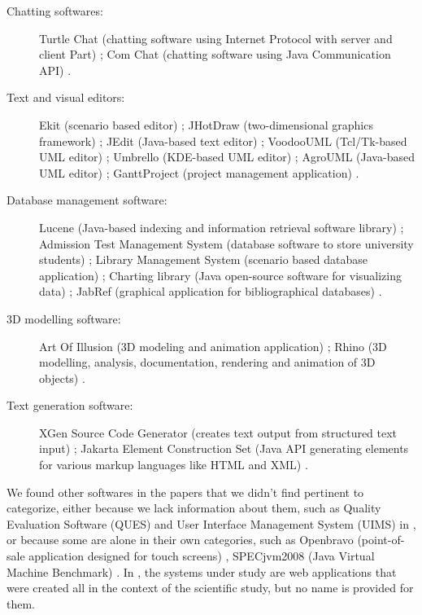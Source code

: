     \begin{description}
        \item[Chatting softwares:] Turtle Chat (chatting software using Internet Protocol with server and client Part) \cite{s23_coupling}; Com Chat (chatting software using Java Communication API) \cite{s23_coupling}.
        
        \item[Text and visual editors:] Ekit (scenario based editor) \cite{s88_coupling}; JHotDraw (two-dimensional graphics framework) \cite{s89_coupling, s116_maintainability}; JEdit (Java-based text editor) \cite{s116_maintainability};  VoodooUML (Tcl/Tk-based UML editor) \cite{s89_coupling}; Umbrello (KDE-based UML editor) \cite{s89_coupling}; AgroUML (Java-based UML editor) \cite{s29_cohesion}; GanttProject (project management application) \cite{s12_cohesion}. 
        
        \item[Database management software:] Lucene (Java-based indexing and information retrieval software library) \cite{s116_maintainability}; Admission Test Management System (database software to store university students) \cite{s23_coupling}; Library Management System (scenario based database application) \cite{s88_coupling}; Charting library (Java open-source software for visualizing data) \cite{s118_cohesion}; JabRef (graphical application for bibliographical databases) \cite{s12_cohesion}.
        
        \item[3D modelling software:] Art Of Illusion (3D modeling and animation application) \cite{s12_cohesion}; Rhino (3D modelling, analysis, documentation, rendering and animation of 3D objects) \cite{s89_coupling}.
        
        \item[Text generation software:] XGen Source Code Generator (creates text output from structured text input) \cite{s68_understandability}; Jakarta Element Construction Set (Java API generating elements for various markup languages like HTML and XML) \cite{s68_understandability}.
        
    \end{description}
    
    We found other softwares in the papers that we didn't find pertinent to categorize, either because we lack information about them, such as Quality Evaluation Software (QUES) and User Interface Management System (UIMS) in \cite{s13_maintainability}, or because some are alone in their own categories, such as Openbravo (point-of-sale application designed for touch screens) \cite{s12_cohesion}, SPECjvm2008 (Java Virtual Machine Benchmark) \cite{s88_coupling}. In \cite{s219_maintainability}, the systems under study are web applications that were created all in the context of the scientific study, but no name is provided for them.
    
